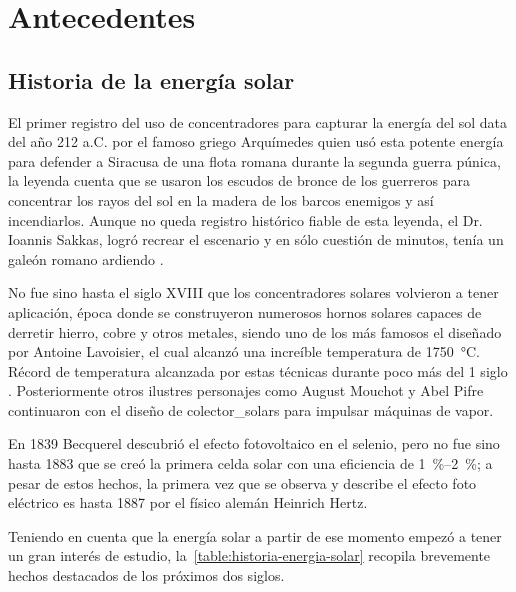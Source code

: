 \section{Antecedentes}

	\subsection{Historia de la energía solar}
		
		El primer registro del uso de concentradores para capturar la energía del sol data del año 212 a.C. por el famoso griego Arquímedes quien usó esta potente energía para defender a Siracusa de una flota romana durante la segunda guerra púnica, la leyenda cuenta que se usaron los escudos de bronce de los guerreros para concentrar los rayos del sol en la madera de los barcos enemigos y así incendiarlos. Aunque no queda registro histórico fiable de esta leyenda, el Dr. Ioannis Sakkas, logró recrear el escenario y en sólo cuestión de minutos, tenía un galeón romano ardiendo \cite{africa_archimedes_1975}.
		
		No fue sino hasta el siglo XVIII que los concentradores solares volvieron a tener aplicación, época donde se construyeron numerosos hornos solares capaces de derretir hierro, cobre y otros metales, siendo uno de los más famosos el diseñado por Antoine Lavoisier, el cual alcanzó una increíble temperatura de \SI{1750}{\degreeCelsius}. Récord de temperatura alcanzada por estas técnicas durante poco más del 1 siglo \cite{kalogirou_solar_2004}. Posteriormente otros ilustres personajes como August Mouchot y Abel Pifre continuaron con el diseño de \glspl{colector_solar} para impulsar máquinas de vapor.
		
		En 1839 Becquerel descubrió el efecto fotovoltaico en el selenio, pero no fue sino hasta 1883 que se creó la primera celda solar con una eficiencia de \qtyrange{1}{2}{\percent}; a pesar de estos hechos, la primera vez que se observa y describe el efecto foto eléctrico es hasta 1887 por el físico alemán Heinrich Hertz. 
		
		Teniendo en cuenta que la energía solar a partir de ese momento empezó a tener un gran interés de estudio, la~\cref{table:historia-energia-solar} recopila brevemente hechos destacados de los próximos dos siglos.
		
